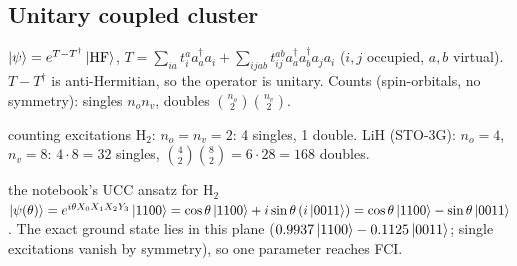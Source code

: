 \documentclass[11pt,a4paper,openany]{book}
\newcounter{wex}[chapter]
\begin{document}
\subsection{Unitary coupled cluster}
$\ket\psi = e^{T - T^\dagger}\ket{\mathrm{HF}}$, $T = \sum_{ia}t_i^aa_a^\dagger a_i + \sum_{ijab}t_{ij}^{ab}a_a^\dagger a_b^\dagger a_ja_i$ ($i, j$ occupied, $a, b$ virtual). $T - T^\dagger$ is anti-Hermitian, so
the operator is unitary. Counts (spin-orbitals, no symmetry): singles $n_on_v$, doubles $\binom{n_o}{2}\binom{n_v}{2}$.
\begin{wexample}{counting excitations}
H$_2$: $n_o = n_v = 2$: 4 singles, 1 double. LiH (STO-3G): $n_o = 4$, $n_v = 8$: $4\cdot8 = 32$ singles, $\binom42\binom82 = 6\cdot28 = 168$ doubles.
\end{wexample}
\begin{keyres}{the notebook's UCC ansatz for H$_2$}
$\ket{\psi(\theta)} = e^{i\theta X_0X_1X_2Y_3}\ket{1100} = \cos\theta\ket{1100} + i\sin\theta\,(i\ket{0011}) = \cos\theta\ket{1100} - \sin\theta\ket{0011}$.
The exact ground state lies in this plane ($0.9937\ket{1100} - 0.1125\ket{0011}$; single excitations vanish by symmetry), so one parameter reaches FCI.
\end{keyres}
\end{document}
